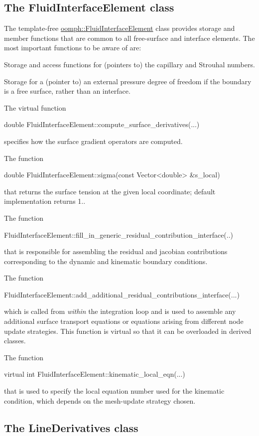 \hypertarget{index_fluid_interface}{}\subsection{The Fluid\+Interface\+Element class}\label{index_fluid_interface}
The template-\/free \hyperlink{classoomph_1_1FluidInterfaceElement}{oomph\+::\+Fluid\+Interface\+Element} class provides storage and member functions that are common to all free-\/surface and interface elements. The most important functions to be aware of are\+:
\begin{DoxyItemize}
\item Storage and access functions for (pointers to) the capillary and Strouhal numbers.
\item Storage for a (pointer to) an external pressure degree of freedom if the boundary is a free surface, rather than an interface.
\item The virtual function 
\begin{DoxyCode}
\textcolor{keywordtype}{double} FluidInterfaceElement::compute\_surface\_derivatives(...)
\end{DoxyCode}
 specifies how the surface gradient operators are computed.
\item The function 
\begin{DoxyCode}
\textcolor{keywordtype}{double} FluidInterfaceElement::sigma(\textcolor{keyword}{const} Vector<double> &s\_local) 
\end{DoxyCode}
 that returns the surface tension at the given local coordinate; default implementation returns 1..
\item The function 
\begin{DoxyCode}
FluidInterfaceElement::fill\_in\_generic\_residual\_contribution\_interface(..)
\end{DoxyCode}
 that is responsible for assembling the residual and jacobian contributions corresponding to the dynamic and kinematic boundary conditions.
\item The function 
\begin{DoxyCode}
FluidInterfaceElement::add\_additional\_residual\_contributions\_interface(...)
\end{DoxyCode}
 which is called from {\itshape  within } the integration loop and is used to assemble any additional surface transport equations or equations arising from different node update strategies. This function is virtual so that it can be overloaded in derived classes.
\item The function 
\begin{DoxyCode}
\textcolor{keyword}{virtual} \textcolor{keywordtype}{int} FluidInterfaceElement::kinematic\_local\_eqn(...)
\end{DoxyCode}
 that is used to specify the local equation number used for the kinematic condition, which depends on the mesh-\/update strategy chosen.
\end{DoxyItemize}\hypertarget{index_line}{}\subsection{The Line\+Derivatives class}\label{index_line}
